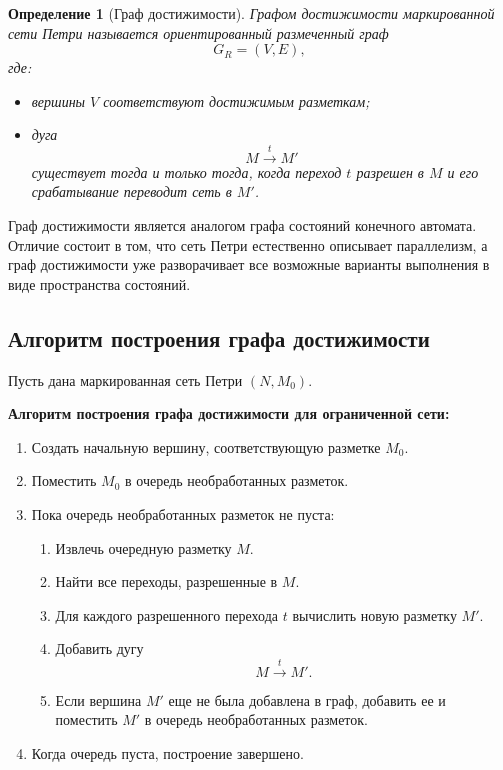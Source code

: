 \documentclass[12pt,a4paper]{article}
\newtheorem{definition}{Определение}
\begin{document}
\begin{definition}[Граф достижимости]
Графом достижимости маркированной сети Петри называется ориентированный размеченный граф
\[
G_R = (V,E),
\]
где:
\begin{itemize}
    \item вершины $V$ соответствуют достижимым разметкам;
    \item дуга
    \[
    M \xrightarrow{t} M'
    \]
    существует тогда и только тогда, когда переход $t$ разрешен в $M$ и его срабатывание переводит сеть в $M'$.
\end{itemize}
\end{definition}

Граф достижимости является аналогом графа состояний конечного автомата. Отличие состоит в том, что сеть Петри естественно описывает параллелизм, а граф достижимости уже разворачивает все возможные варианты выполнения в виде пространства состояний.

\subsection{Алгоритм построения графа достижимости}

Пусть дана маркированная сеть Петри $(N,M_0)$.

\textbf{Алгоритм построения графа достижимости для ограниченной сети:}

\begin{enumerate}
    \item Создать начальную вершину, соответствующую разметке $M_0$.
    \item Поместить $M_0$ в очередь необработанных разметок.
    \item Пока очередь необработанных разметок не пуста:
    \begin{enumerate}
        \item Извлечь очередную разметку $M$.
        \item Найти все переходы, разрешенные в $M$.
        \item Для каждого разрешенного перехода $t$ вычислить новую разметку $M'$.
        \item Добавить дугу
        \[
        M \xrightarrow{t} M'.
        \]
        \item Если вершина $M'$ еще не была добавлена в граф, добавить ее и поместить $M'$ в очередь необработанных разметок.
    \end{enumerate}
    \item Когда очередь пуста, построение завершено.
\end{enumerate}
\end{document}
